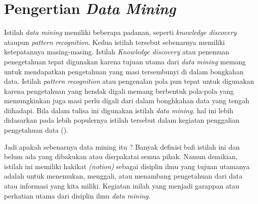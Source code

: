 \section{Pengertian \textit{Data Mining}}
Istilah \textit{data mining} memiliki beberapa padanan, seperti \textit{knowledge discovery} ataupun  \textit{pattern recognition}. Kedua istilah tersebut sebenarnya memiliki ketepatannya masing-masing. Istilah \textit{Knowledge discovery} atau penemuan penegetahuan tepat digunakan karena tujuan utama dari \textit{data mining} memang untuk mendapatkan pengetahuan yang masi tersembunyi di dalam bongkahan data. Istilah \textit{pattern recognition} atau pengenalan pola pun tepat untuk digunakan karena pengetahuan yang hendak digali memang berbentuk pola-pola yang memungkinkan juga masi perlu digali dari dalam bonghkahan data yang tengah diihadapi. Bila dalam tulisa ini digunakan istilah \textit{data mining}. hal ini lebih didasarkan pada lebih populernya istilah tersebut dalam kegiatan penggalian pengetahuan data (\cite{susanto2010pengantar}).
\par Jadi apakah sebenarnya data mining itu ? Banyak definisi bafi istilah ini dan belum ada yang dibakukan atau disrpakatai semua pihak. Namun demikian, istilah ini memiliki hakikat \textit{(notion)} sebagai disiplin ilmu yang tujuan utamanya adalah untuk menemukan, menggali, atau menambang pengetahuan dari data atau informasi yang kita miliki. Kegiatan inilah yang menjadi garappan atau perhatian utama dari disiplin ilmu \textit{data mining}.

